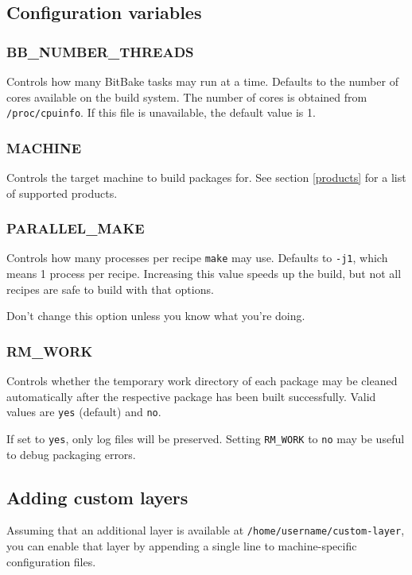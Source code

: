 \documentclass[a4paper]{article}
\newcommand{\shell}[1]{\texttt{\small #1}}
\begin{document}
  \subsection{Configuration variables}
    \subsubsection{BB\_NUMBER\_THREADS}
      Controls how many BitBake tasks may run at a time. Defaults to the
      number of cores available on the build system. The number of cores is
      obtained from \shell{/proc/cpuinfo}. If this file is unavailable, the
      default value is 1.

    \subsubsection{MACHINE}
      Controls the target machine to build packages for. See section \ref{products}
      for a list of supported products.

    \subsubsection{PARALLEL\_MAKE}
      Controls how many processes per recipe \shell{make} may use. Defaults to
      \shell{-j1}, which means 1 process per recipe. Increasing this value speeds
      up the build, but not all recipes are safe to build with that options.

      Don't change this option unless you know what you're doing.

    \subsubsection{RM\_WORK}
      Controls whether the temporary work directory of each package may be
      cleaned automatically after the respective package has been built
      successfully. Valid values are \shell{yes} (default) and \shell{no}.

      If set to \shell{yes}, only log files will be preserved. Setting
      \shell{RM\_WORK} to \shell{no} may be useful to debug packaging errors.

  \subsection{Adding custom layers}
  \label{custom_layers}
     Assuming that an additional layer is available at \shell{/home/username/custom-layer},
     you can enable that layer by appending a single line to machine-specific configuration
     files.
\end{document}
